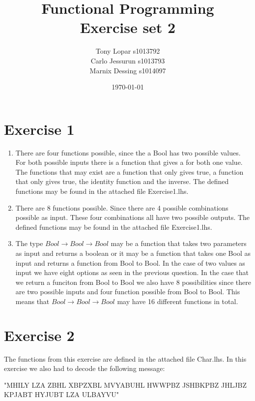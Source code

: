 \documentclass{article}
\begin{document}
\title{Functional Programming \\ Exercise set 2}
\date{\today}
\author{Tony Lopar s1013792 \\ Carlo Jessurun s1013793 \\ Marnix Dessing s1014097}
\maketitle

\section*{Exercise 1}
\begin{enumerate}
  \item There are four functions possible, since the a Bool has two possible values. For both possible inputs there is a function that gives a for both one value. The functions that may exist are a function that only gives true, a function that only gives true, the identity function and the inverse. The defined functions may be found in the attached file Exercise1.lhs.
  \item There are 8 functions possible. Since there are 4 possible combinations possible as input. These four combinations all have two possible outputs. The defined functions may be found in the attached file Exercise1.lhs.
  \item The type $Bool \rightarrow Bool \rightarrow Bool$ may be a function that takes two parameters as input and returns a boolean or it may be a function that takes one Bool as input and returns a function from Bool to Bool. In the case of two values as input we have eight options as seen in the previous question. In the case that we return a funciton from Bool to Bool we also have 8 possibilities since there are two possible inputs and four function possible from Bool to Bool. This means that $Bool \rightarrow Bool \rightarrow Bool$ may have 16 different functions in total.
\end{enumerate}

\section*{Exercise 2}
The functions from this exercise are defined in the attached file Char.lhs. In this exercise we also had to decode the following message:

"MHILY LZA ZBHL XBPZXBL MVYABUHL HWWPBZ JSHBKPBZ JHLJBZ KPJABT HYJUBT LZA ULBAYVU"
\end{document}

